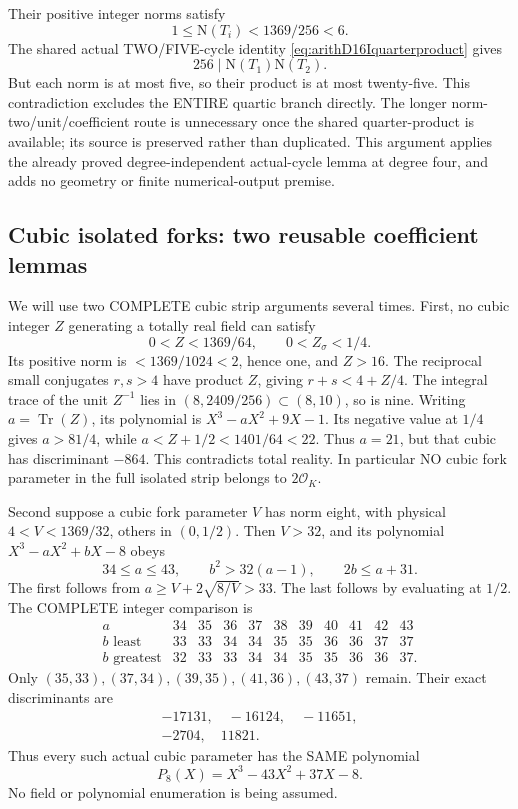\documentclass[11pt]{article}
\begin{document}
Their positive integer norms satisfy
\[
                          1\le\mathrm N(T_i)<1369/256<6 .
\]
The shared actual TWO/FIVE-cycle identity
\eqref{eq:arithD16Iquarterproduct} gives
\[
                           256\mid\mathrm N(T_1)\mathrm N(T_2).
\]
But each norm is at most five, so
their product is at most twenty-five.
This contradiction excludes the ENTIRE
quartic branch directly.
The longer norm-two/unit/coefficient
route is unnecessary once the shared
quarter-product is available; its source
is preserved rather than duplicated.
This argument applies the already proved
degree-independent actual-cycle lemma
at degree four, and adds no geometry
or finite numerical-output premise.

\subsection{Cubic isolated forks: two reusable coefficient lemmas}
\label{app:arithD16Icubiclemmas}

We will use two COMPLETE cubic strip
arguments several times.
First, no cubic integer \(Z\) generating
a totally real field can satisfy
\[
                   0<Z<1369/64,\qquad0<Z_\sigma<1/4 .
\]
Its positive norm is \(<1369/1024<2\),
hence one, and \(Z>16\).
The reciprocal small conjugates \(r,s>4\)
have product \(Z\), giving
\(r+s<4+Z/4\).
The integral trace of the unit \(Z^{-1}\)
lies in \((8,2409/256)\subset(8,10)\),
so is nine.
Writing \(a=\operatorname{Tr}(Z)\),
its polynomial is \(X^3-aX^2+9X-1\).
Its negative value at \(1/4\) gives
\(a>81/4\), while
\(a<Z+1/2<1401/64<22\).
Thus \(a=21\), but that cubic has
discriminant \(-864\).
This contradicts total reality.
In particular NO cubic fork parameter
in the full isolated strip belongs
to \(2\mathcal O_K\).

Second suppose a cubic fork parameter
\(V\) has norm eight, with physical
\(4<V<1369/32\), others in \((0,1/2)\).
Then \(V>32\), and its polynomial
\(X^3-aX^2+bX-8\) obeys
\[
                   34\le a\le43,\qquad
                   b^2>32(a-1),\qquad2b\le a+31 .
\]
The first follows from
\(a\ge V+2\sqrt{8/V}>33\).
The last follows by evaluating at
\(1/2\).
The COMPLETE integer comparison is
\[
\begin{array}{c|rrrrrrrrrr}
a&34&35&36&37&38&39&40&41&42&43\\ \hline
b\text{ least}&33&33&34&34&35&35&36&36&37&37\\
b\text{ greatest}&32&33&33&34&34&35&35&36&36&37 .
\end{array}
\]
Only \((35,33),(37,34),(39,35),
(41,36),(43,37)\) remain.
Their exact discriminants are
\[
\begin{gathered}
-17131,\quad-16124,\quad-11651,\\
-2704,\quad11821.
\end{gathered}
\]
Thus every such actual cubic parameter
has the SAME polynomial
\[
                               P_8(X)=X^3-43X^2+37X-8 .
\tag{D16IP8}\label{eq:arithD16Icubicnormeight}
\]
No field or polynomial enumeration
is being assumed.
\end{document}

